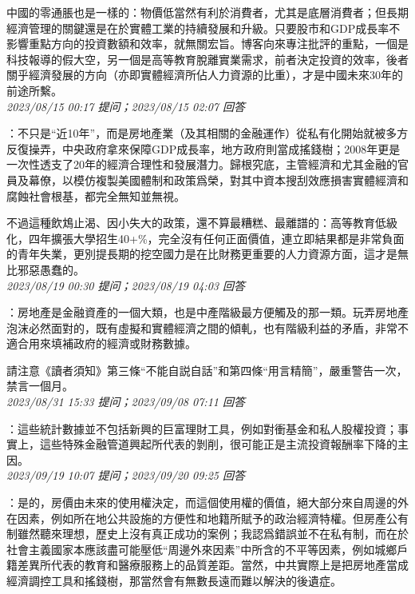 \documentclass[twocolumn]{ctexart}
\begin{document}
中國的零通脹也是一樣的：物價低當然有利於消費者，尤其是底層消費者；但長期經濟管理的關鍵還是在於實體工業的持續發展和升級。只要股市和GDP成長率不影響重點方向的投資數額和效率，就無關宏旨。博客向來專注批評的重點，一個是科技報導的假大空，另一個是高等教育脫離實業需求，前者決定投資的效率，後者關乎經濟發展的方向（亦即實體經濟所佔人力資源的比重），才是中國未來30年的前途所繫。
\\

\textit{\hfill\noindent\small 2023/08/15 00:17 提问；2023/08/15 02:07 回答}

：不只是“近10年”，而是房地產業（及其相關的金融運作）從私有化開始就被多方反復操弄，中央政府拿來保障GDP成長率，地方政府則當成搖錢樹；2008年更是一次性透支了20年的經濟合理性和發展潛力。歸根究底，主管經濟和尤其金融的官員及幕僚，以模仿複製美國體制和政策爲榮，對其中資本搜刮效應損害實體經濟和腐蝕社會根基，都完全無知並無視。

不過這種飲鴆止渴、因小失大的政策，還不算最糟糕、最離譜的：高等教育低級化，四年擴張大學招生40+\%，完全沒有任何正面價值，連立即結果都是非常負面的青年失業，更別提長期的挖空國力是在比財務更重要的人力資源方面，這才是無比邪惡愚蠢的。
\\

\textit{\hfill\noindent\small 2023/08/19 00:30 提问；2023/08/19 04:03 回答}

：房地產是金融資產的一個大類，也是中產階級最方便觸及的那一類。玩弄房地產泡沫必然面對的，既有虛擬和實體經濟之間的傾軋，也有階級利益的矛盾，非常不適合用來填補政府的經濟或財務數據。

請注意《讀者須知》第三條“不能自説自話”和第四條“用言精簡”，嚴重警告一次，禁言一個月。
\\

\textit{\hfill\noindent\small 2023/08/31 15:33 提问；2023/09/08 07:11 回答}

：這些統計數據並不包括新興的巨富理財工具，例如對衝基金和私人股權投資；事實上，這些特殊金融管道興起所代表的剝削，很可能正是主流投資報酬率下降的主因。
\\

\textit{\hfill\noindent\small 2023/09/19 10:07 提问；2023/09/20 09:25 回答}

：是的，房價由未來的使用權決定，而這個使用權的價值，絕大部分來自周邊的外在因素，例如所在地公共設施的方便性和地籍所賦予的政治經濟特權。但房產公有制雖然聽來理想，歷史上沒有真正成功的案例；我認爲錯誤並不在私有制，而在於社會主義國家本應該盡可能壓低“周邊外來因素”中所含的不平等因素，例如城鄉戶籍差異所代表的教育和醫療服務上的品質差距。當然，中共實際上是把房地產當成經濟調控工具和搖錢樹，那當然會有無數長遠而難以解決的後遺症。
\\
\end{document}
